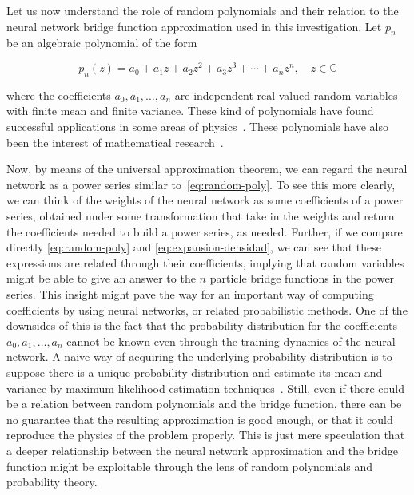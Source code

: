 Let us now understand the role of random polynomials and their relation to the neural
network bridge function approximation used in this investigation.
Let $p_n$ be an algebraic polynomial of the form

\begin{equation}
    p_n(z) = a_0 + a_1 z + a_2 z^2 + a_3 z^3 + \cdots + a_n z^n, \quad
    z \in \mathbb{C}
    \label{eq:random-poly}
\end{equation}

where the coefficients $a_0, a_1, \dots , a_n$ are independent real-valued random variables
with finite mean and finite variance. These kind of polynomials have found successful
applications in some areas of physics~\cite{houghZerosGaussianAnalytic2009}.
These polynomials have also been the interest of mathematical research~\cite{edelmanHowManyZeros1995}.

Now, by means of the universal approximation theorem, we can regard the neural network
as a power series similar to~\eqref{eq:random-poly}. To see this more clearly, we
can think of the weights of the neural network as some coefficients of a power series,
obtained under some transformation that take in the weights and return the coefficients
needed to build a power series, as needed.
Further, if we compare directly \autoref{eq:random-poly}
and \autoref{eq:expansion-densidad}, we can see that these expressions
are related through their coefficients, implying that random variables might be able
to give an answer to the $n$ particle bridge functions in the power series.
This insight might pave the way for an important way of computing coefficients
by using neural networks, or related probabilistic methods.
One of the downsides of this is the fact that the probability
distribution for the coefficients $a_0, a_1, \dots , a_n$ cannot be known even through the
training dynamics of the neural network. A naive way of acquiring the underlying 
probability distribution is to suppose there is
a unique probability distribution and estimate its mean and variance by maximum likelihood
estimation techniques~\cite{hastieElementsStatisticalLearning2009}.
Still, even if there could be a relation between random polynomials and the bridge 
function, there can be no guarantee that the resulting approximation is good enough, or 
that it could reproduce the physics of the problem properly.
This is just mere speculation that a deeper relationship between the neural network 
approximation and the bridge function might be exploitable through the lens of random
polynomials and probability theory.

